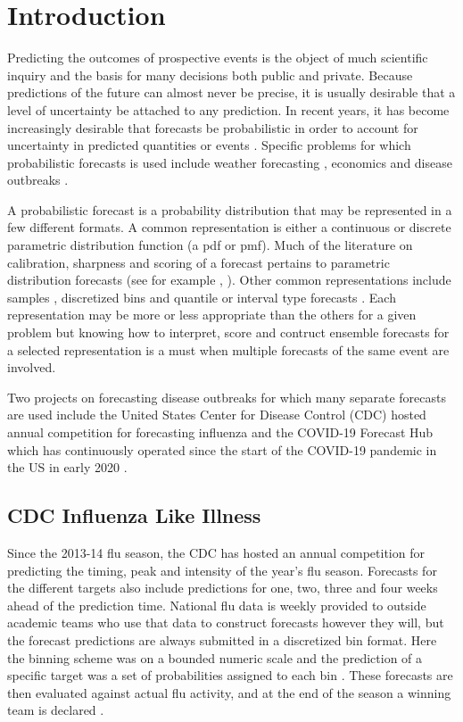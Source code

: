 \documentclass{article}\usepackage[]{graphicx}\usepackage[]{color}
\begin{document}
\section{Introduction}
Predicting the outcomes of prospective events is the object of much scientific
inquiry and the basis for many decisions both public and private. Because 
predictions of the future can almost never be precise, it is usually desirable
that a level of uncertainty be attached to any prediction. In recent years, it
has become increasingly desirable that forecasts be probabilistic in order to 
account for uncertainty in predicted quantities or events 
\cite{gneiting2014probabilistic}. Specific problems for 
which probabilistic forecasts is used include weather forecasting
\cite{baran2018combining}, economics \cite{groen2013real} and disease outbreaks
\cite{yamana2016superensemble}.

A probabilistic forecast is a probability distribution that may be represented
in a few different formats. A common representation is either a continuous or
discrete parametric distribution function (a pdf or pmf). Much of the literature 
on calibration, sharpness and scoring of a forecast pertains to parametric 
distribution forecasts (see for example 
\cite{gneiting2007probabilistic},
\cite{gneiting2013combining} \cite{baran2018combining}).
Other common representations include samples \cite{krueger2016probabilistic}, 
discretized bins 
and quantile or interval type forecasts \cite{taylor2021evaluating} 
\cite{bracher2021evaluating}. Each representation may be more or less 
appropriate than the others for a given problem but knowing how to interpret, 
score and contruct ensemble forecasts for a selected representation is a must 
when multiple forecasts of the same event are involved.

Two projects on forecasting disease outbreaks for which many separate forecasts 
are used include the United States Center for Disease Control (CDC) hosted
annual competition for forecasting influenza \cite{cdcflusight}
and the COVID-19 Forecast Hub which has 
continuously operated since the start of the COVID-19 pandemic in the US in 
early 2020 \cite{Cramer2021-hub-dataset}.

\subsection{CDC Influenza Like Illness}

Since the 2013-14 flu season, the CDC has hosted an annual competition for 
predicting the timing, peak and intensity of the year's flu season. Forecasts
for the different targets also include predictions for one, two, three and 
four weeks ahead of the prediction time. National flu data is weekly provided 
to outside academic teams who use that data to construct forecasts however they
will, but the forecast predictions are always submitted in a discretized bin
format. Here the binning scheme was on a bounded numeric scale and the 
prediction of a specific target was a set of probabilities assigned to each bin
\cite{mcgowan2019collaborative}.
These forecasts are then evaluated against actual flu activity, and at 
the end of the season a winning team is declared \cite{cdcflusight}.
\end{document}
